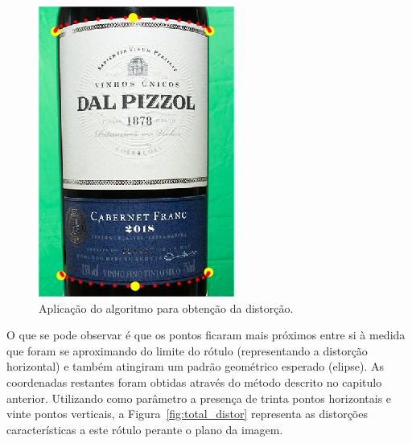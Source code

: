 \begin{figure}[htb]
    \caption{Aplicação do algoritmo para obtenção da distorção. }
    \centering
    \vspace{.3cm}
    \begin{minipage}{.3\textwidth}
      \centering
         \includegraphics[width=\textwidth]{TCC/Imagens/pontos_horizontal.jpg}
	\end{minipage}
    \label{fig:pontos_horizontal}
\end{figure}
    
O que se pode observar é que os pontos ficaram mais próximos entre si à medida que foram se aproximando do limite do rótulo (representando a distorção horizontal) e também atingiram um padrão geométrico esperado (elipse). As coordenadas restantes foram obtidas através do método descrito no capitulo anterior. Utilizando como parâmetro a presença de trinta pontos horizontais e vinte pontos verticais, a Figura~\ref{fig:total_distor} representa as distorções características a este rótulo perante o plano da imagem.

